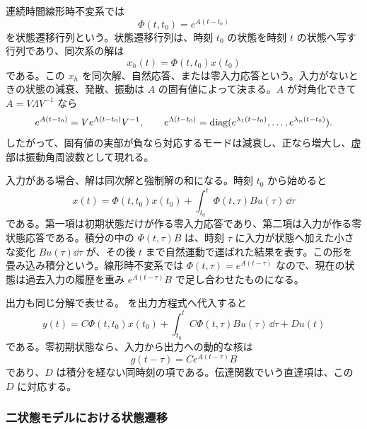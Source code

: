 連続時間線形時不変系では
\begin{equation}
  \Phi(t,t_0)=e^{A(t-t_0)}
  \label{eq:state-transition-matrix}
\end{equation}
を状態遷移行列という。状態遷移行列は、時刻 $t_0$ の状態を時刻 $t$ の状態へ写す行列であり、同次系の解は
\begin{equation}
  x_h(t)=\Phi(t,t_0)x(t_0)
  \label{eq:homogeneous-solution}
\end{equation}
である。この $x_h$ を同次解、自然応答、または零入力応答という。入力がないときの状態の減衰、発散、振動は $A$ の固有値によって決まる。$A$ が対角化できて $A=V\Lambda V^{-1}$ なら
\begin{equation}
  e^{A(t-t_0)}=V e^{\Lambda(t-t_0)}V^{-1},\qquad
  e^{\Lambda(t-t_0)}=\operatorname{diag}(e^{\lambda_1(t-t_0)},\ldots,e^{\lambda_n(t-t_0)}).
\end{equation}
したがって、固有値の実部が負なら対応するモードは減衰し、正なら増大し、虚部は振動角周波数として現れる。

入力がある場合、解は同次解と強制解の和になる。時刻 $t_0$ から始めると
\begin{equation}
  x(t)=\Phi(t,t_0)x(t_0)
  +\int_{t_0}^{t}\Phi(t,\tau)Bu(\tau)\,\dd\tau
  \label{eq:ss-solution}
\end{equation}
である。第一項は初期状態だけが作る零入力応答であり、第二項は入力が作る零状態応答である。積分の中の $\Phi(t,\tau)B$ は、時刻 $\tau$ に入力が状態へ加えた小さな変化 $Bu(\tau)\dd\tau$ が、その後 $t$ まで自然運動で運ばれた結果を表す。この形を畳み込み積分という。線形時不変系では $\Phi(t,\tau)=e^{A(t-\tau)}$ なので、現在の状態は過去入力の履歴を重み $e^{A(t-\tau)}B$ で足し合わせたものになる。

出力も同じ分解で表せる。 を出力方程式へ代入すると
\begin{equation}
  y(t)=C\Phi(t,t_0)x(t_0)
  +\int_{t_0}^{t}C\Phi(t,\tau)Bu(\tau)\,\dd\tau
  +Du(t)
  \label{eq:ss-output-solution}
\end{equation}
である。零初期状態なら、入力から出力への動的な核は
\begin{equation}
  g(t-\tau)=Ce^{A(t-\tau)}B
\end{equation}
であり、$D$ は積分を経ない同時刻の項である。伝達関数でいう直達項は、この $D$ に対応する。

\subsubsection{二状態モデルにおける状態遷移}


